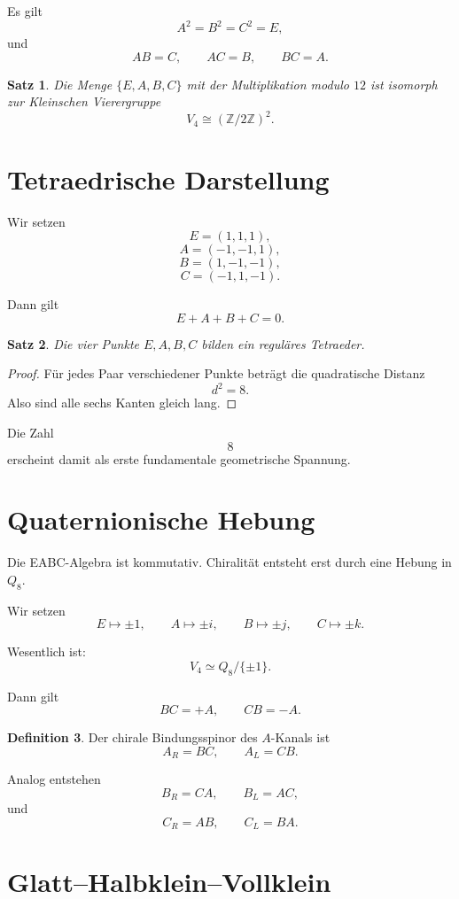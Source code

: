 \documentclass[11pt,a4paper]{article}
\newtheorem{satz}{Satz}[section]
\theoremstyle{definition}
\newtheorem{definition}[satz]{Definition}
\begin{document}
	Es gilt
	\[
	A^2=B^2=C^2=E,
	\]
	und
	\[
	AB=C,\qquad AC=B,\qquad BC=A.
	\]
	
	\begin{satz}
		Die Menge \(\{E,A,B,C\}\) mit der Multiplikation modulo \(12\) ist isomorph zur Kleinschen Vierergruppe
		\[
		V_4\cong(\mathbb Z/2\mathbb Z)^2.
		\]
	\end{satz}
	
	\section{Tetraedrische Darstellung}
	
	Wir setzen
	\[
	E=(1,1,1),
	\]
	\[
	A=(-1,-1,1),
	\]
	\[
	B=(1,-1,-1),
	\]
	\[
	C=(-1,1,-1).
	\]
	
	Dann gilt
	\[
	E+A+B+C=0.
	\]
	
	\begin{satz}
		Die vier Punkte \(E,A,B,C\) bilden ein reguläres Tetraeder.
	\end{satz}
	
	\begin{proof}
		Für jedes Paar verschiedener Punkte beträgt die quadratische Distanz
		\[
		d^2=8.
		\]
		Also sind alle sechs Kanten gleich lang.
	\end{proof}
	
	Die Zahl
	\[
	8
	\]
	erscheint damit als erste fundamentale geometrische Spannung.
	
	\section{Quaternionische Hebung}
	
	Die EABC-Algebra ist kommutativ. Chiralität entsteht erst durch eine Hebung in \(Q_8\).
	
	Wir setzen
	\[
	E\mapsto\pm1,\qquad
	A\mapsto\pm i,\qquad
	B\mapsto\pm j,\qquad
	C\mapsto\pm k.
	\]
	
	Wesentlich ist:
	\[
	V_4\simeq Q_8/\{\pm1\}.
	\]
	
	Dann gilt
	\[
	BC=+A,\qquad CB=-A.
	\]
	
	\begin{definition}
		Der chirale Bindungsspinor des \(A\)-Kanals ist
		\[
		A_R=BC,\qquad A_L=CB.
		\]
	\end{definition}
	
	Analog entstehen
	\[
	B_R=CA,\qquad B_L=AC,
	\]
	und
	\[
	C_R=AB,\qquad C_L=BA.
	\]
	
	\section{Glatt--Halbklein--Vollklein}
	
\end{document}
